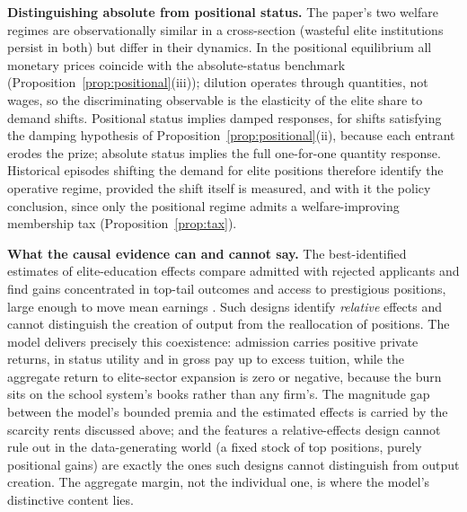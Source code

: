 \documentclass[12pt,letterpaper]{article}
\theoremstyle{definition}
\begin{document}
\textbf{Distinguishing absolute from positional status.}
The paper's two welfare regimes are observationally similar in a cross-section (wasteful elite institutions persist in both) but differ in their dynamics.
In the positional equilibrium all monetary prices coincide with the absolute-status benchmark (Proposition~\ref{prop:positional}(iii)); dilution operates through quantities, not wages, so the discriminating observable is the elasticity of the elite share to demand shifts.
Positional status implies damped responses, for shifts satisfying the damping hypothesis of Proposition~\ref{prop:positional}(ii), because each entrant erodes the prize; absolute status implies the full one-for-one quantity response.
Historical episodes shifting the demand for elite positions therefore identify the operative regime, provided the shift itself is measured, and with it the policy conclusion, since only the positional regime admits a welfare-improving membership tax (Proposition~\ref{prop:tax}).

\textbf{What the causal evidence can and cannot say.}
The best-identified estimates of elite-education effects compare admitted with rejected applicants and find gains concentrated in top-tail outcomes and access to prestigious positions, large enough to move mean earnings \citep{zimmerman2019elite,chettydemingfriedman2026}.
Such designs identify \emph{relative} effects and cannot distinguish the creation of output from the reallocation of positions.
The model delivers precisely this coexistence: admission carries positive private returns, in status utility and in gross pay up to excess tuition, while the aggregate return to elite-sector expansion is zero or negative, because the burn sits on the school system's books rather than any firm's.
The magnitude gap between the model's bounded premia and the estimated effects is carried by the scarcity rents discussed above; and the features a relative-effects design cannot rule out in the data-generating world (a fixed stock of top positions, purely positional gains) are exactly the ones such designs cannot distinguish from output creation.
The aggregate margin, not the individual one, is where the model's distinctive content lies.
\end{document}
